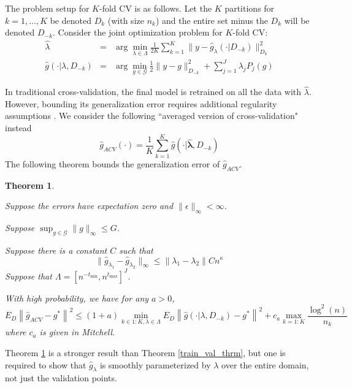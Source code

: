 \documentclass[12pt]{article}
\newtheorem{theorem}{Theorem}
\begin{document}
The problem setup for $K$-fold CV is as follows. Let the $K$ partitions for $k=1,...,K$ be denoted $D_k$ (with size $n_k$) and the entire set minus the $D_k$ will be denoted $D_{-k}$. Consider the joint optimization problem for $K$-fold CV:
\begin{eqnarray}
\label{kfold_opt}
\hat{\lambda} &=& \arg\min_{\lambda\in\Lambda} \frac{1}{2K} \sum_{k=1}^K  \| y-\hat{g}_{\lambda}(\cdot| D_{-k}) \|_{D_k}^{2} \\
\hat{g}(\cdot | \lambda, D_{-k})&=&\arg\min_{g\in\mathcal{G}} \frac{1}{2} \| y-g \|_{D_{-k}}^{2} + \sum_{j=1}^J \lambda_j P_j(g)
\end{eqnarray}

In traditional cross-validation, the final model is retrained on all the data with $\hat{\lambda}$. However, bounding its generalization error requires additional regularity assumptions \citep{lecue2012oracle}. We consider the following ``averaged version of cross-validation" instead
\begin{equation}
\hat{g}_{ACV}(\cdot) = \frac{1}{K} \sum_{k=1}^K \hat{g}(\cdot | \hat{\boldsymbol \lambda}, D_{-k})
\end{equation}
The following theorem bounds the generalization error of $\hat{g}_{ACV}$.

\begin{theorem}
\label{kfold_thrm}

Suppose the errors have expectation zero and $\| \epsilon \|_\infty < \infty $.

Suppose $\sup_{g \in \mathcal{G}} \|g\|_\infty \le G$.

Suppose there is a constant $C$ such that
\begin{equation}
\| \hat{g}_{\lambda_1} - \hat{g}_{\lambda_2} \|_\infty \le \| \lambda_1 - \lambda_2 \| C n^\kappa
\end{equation}
Suppose that $\Lambda = [ n^{-t_{\min}}, n^{t_{\max}} ]^J $.


With high probability, we have for any $a > 0$,
\begin{equation}
\label{smooth_error_bound}
E_{D} \left \| \hat{g}_{ACV} - g^* \right \|^2 \le
(1+a) \min_{k\in 1:K, \lambda \in \Lambda}  E_{D} \left \| \hat{g}(\cdot |\lambda, D_{-k}) - g^* \right \|^2
+ c_a \max_{k=1:K} \frac{\log^2(n)}{n_k}
\end{equation}
where $c_a$ is given in Mitchell.
\end{theorem}


Theorem \ref{kfold_thrm} is a stronger result than Theorem \ref{train_val_thrm}, but one is required to show that $\hat{g}_\lambda$ is smoothly parameterized by $\lambda$ over the entire domain, not just the validation points.
\end{document}
